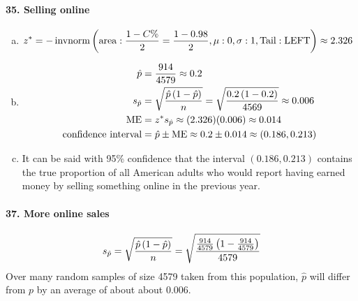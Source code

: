 		\paragraph{35. Selling online}
			\begin{enumerate}[a.]
				\item
					\begin{align*}
						z^*  &= -\operatorname{invnorm}\left(\operatorname{area}:\frac{1 - C\%}{2} = \frac{1 - 0.98}{2}, \mu: 0, \sigma: 1, \mathrm{Tail: LEFT}\right) \approx 2.326
					\end{align*}
				\item
					\begin{align*}
						\hat{p} &= \frac{914}{4579} \approx 0.2 \\
						s_{\hat{p}} &= \sqrt{\frac{\hat{p}\left(1 - \hat{p}\right)}{n}} = \sqrt{\frac{0.2\left(1 - 0.2\right)}{4569}} \approx 0.006\\
						\operatorname{ME} &= z^*s_{\hat{p}} \approx (2.326)(0.006) \approx 0.014 \\
						\text{confidence interval} &= \hat{p} \pm \operatorname{ME} \approx 0.2 \pm 0.014 \approx (0.186, 0.213)
					\end{align*}
				\item
					It can be said with 95\% confidence that the interval $(0.186, 0.213)$ contains the true proportion of all American adults who would report having earned money by selling something online in the previous year.
			\end{enumerate}
		\paragraph{37. More online sales}
			\[
				s_{\hat{p}} = \sqrt{\frac{\hat{p}\left(1 - \hat{p}\right)}{n}} = \sqrt{\frac{\frac{914}{4579}\left(1 - \frac{914}{4579}\right)}{4579}}
			\]
			Over many random samples of size 4579 taken from this population, $\hat{p}$ will differ from $p$ by an average of about about 0.006.
